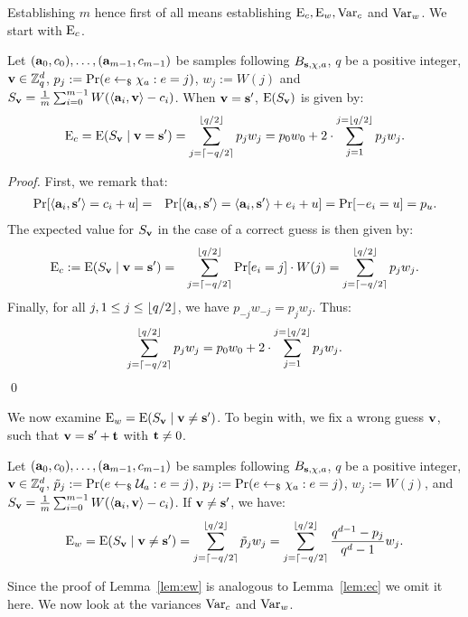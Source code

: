 Establishing $m$ hence first of all means establishing $\textnormal{E}_c,\textnormal{E}_w,\textnormal{Var}_c$ and $\textnormal{Var}_w$. We start with $\textnormal{E}_c$.
\begin{lemma}\label{lem:ec}
Let $(\mathbf{a}_0,c_0),\ldots,(\mathbf{a}_{m-1},c_{m-1})$ be samples following $B_{\mathbf{s},\chi,a}$, $q$ be a positive integer, $\mathbf{v} \in \mathbb{Z}_q^d$,  $p_j := \Pr(e \leftarrow_{\$} \chi_{a} : e = j)$, $w_j := W(j)$ and $S_\mathbf{v} = \frac{1}{m}\sum_{i=0}^{m-1}{W(\langle  \mathbf{a}_i,\mathbf{v}\rangle -c_i)}$.
When $\mathbf{v}=\mathbf{s'}$, $\textnormal{E}(S_\mathbf{v})$ is given by:
\begin{equation}
\textnormal{E}_c=\textnormal{E}(S_\mathbf{v} \mid \mathbf{v} = \mathbf{s'})=\sum_{j=\lceil -q/2 \rceil}^{\lfloor q/2\rfloor}{p_jw_j}= p_0w_0 + 2\cdot\sum_{j=1}^{j=\lfloor q/2\rfloor}{p_jw_j}.
\end{equation}
\end{lemma}
\begin{proof}
First, we remark that:
\begin{eqnarray*}
\Pr[\dotp{\avec_i}{\solvec} = c_i + u] & = & \Pr[\dotp{\avec_i}{\solvec} = \dotp{\avec_i}{\solvec} + e_i +u] =  \Pr[-e_{i} = u] =  p_u.\\
\end{eqnarray*}
The expected value for $S_\mathbf{v}$ in the case of a correct guess is then given by:
\begin{eqnarray*}
\textnormal{E}_c := \textnormal{E}(S_{\mathbf{v}} \mid \mathbf{v} = \mathbf{s'}) & = & 
\sum_{j=\lceil -q/2 \rceil}^{\lfloor q/2\rfloor}{\Pr[e_i=j]\cdot W(j)} =  \sum_{j=\lceil -q/2 \rceil}^{\lfloor q/2\rfloor}{p_j w_j}.
\end{eqnarray*}
Finally, for all $j,1\leq j\leq \lfloor q/2\rfloor$, we have $p_{-j}w_{-j}=p_{j}w_{j}$. Thus: 
$$
\sum_{j=\lceil -q/2 \rceil}^{\lfloor q/2\rfloor}{p_j w_j}=p_0w_0 + 2\cdot\sum_{j=1}^{j=\lfloor q/2\rfloor}{p_jw_j}.
$$
\qed
\end{proof}
We now examine $\textnormal{E}_w=\textnormal{E}(S_{\mathbf{v}}\mid \mathbf{v}\neq \mathbf{s'})$. To begin with, we fix a wrong guess $\mathbf{v}$, such that $\mathbf{v} = \mathbf{s'} + \mathbf{t} $ with $\mathbf{t} \neq 0$.
\begin{lemma}\label{lem:ew}
Let $(\mathbf{a}_0,c_0),\ldots,(\mathbf{a}_{m-1},c_{m-1})$  be samples following $B_{\mathbf{s},\chi,a}$, $q$ be a positive integer, $\mathbf{v} \in \mathbb{Z}_q^d$,  $\tilde{p}_j := \Pr(e \leftarrow_{\$} \mathcal{U}_{a} : e = j)$, ${p}_j := \Pr(e \leftarrow_{\$} {\chi}_{a} : e = j)$, $w_j := W(j)$, and $S_\mathbf{v} = \frac{1}{m}\sum_{i=0}^{m-1}{W(\langle \mathbf{a}_i,\mathbf{v} \rangle -c_i)}$. If $\mathbf{v}\neq \mathbf{s'}$, we have:
\begin{equation}
\textnormal{E}_w = \textnormal{E}(S_{\mathbf{v}}\mid \mathbf{v}\neq \mathbf{s'}) = \sum_{j=\lceil -q/2 \rceil}^{\lfloor q/2\rfloor}{\tilde{p}_jw_j} = 
\sum_{j=\lceil -q/2 \rceil}^{\lfloor q/2\rfloor}{\frac{q^{d-1}-p_j}{q^d-1}w_j}.
\end{equation}
\end{lemma}
Since the proof of Lemma~\ref{lem:ew} is analogous to Lemma~\ref{lem:ec} we omit it here. We now look at the variances $\textnormal{Var}_c$ and $\textnormal{Var}_w$.

